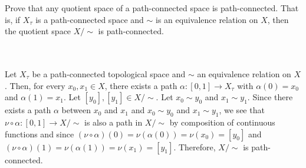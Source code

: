 Prove that any quotient space of a path-connected space is path-connected. That is, if $X_{\tau}$ is a
path-connected space and $\sim$ is an equivalence relation on $X$, then the quotient space $X/\sim$ is
path-connected.\\\\

\begin{solution}\renewcommand{\qedsymbol}{}\ \\
    Let $X_{\tau}$ be a path-connected topological space and $\sim$ an equivalence relation on $X$.
    Then, for every $x_0,x_1\in X$, there exists a path $\alpha:[0,1]\rightarrow X_{\tau}$ with
    $\alpha(0)=x_0$ and $\alpha(1)=x_1$. Let $[y_0],[y_1]\in X/\sim$. Let $x_0\sim y_0$ and
    $x_1\sim y_1$. Since there exists a path $\alpha$ between $x_0$ and $x_1$ and $x_0\sim y_0$ and
    $x_1\sim y_1$, we see that $\nu\circ\alpha:[0,1]\rightarrow X/\sim$ is also a path in $X/\sim$ by
    composition of continuous functions and since $(\nu\circ\alpha)(0)=\nu(\alpha(0))=\nu(x_0)=[y_0]$
    and $(\nu\circ\alpha)(1)=\nu(\alpha(1))=\nu(x_1)=[y_1]$. Therefore, $X/\sim$ is path-connected.

\end{solution}